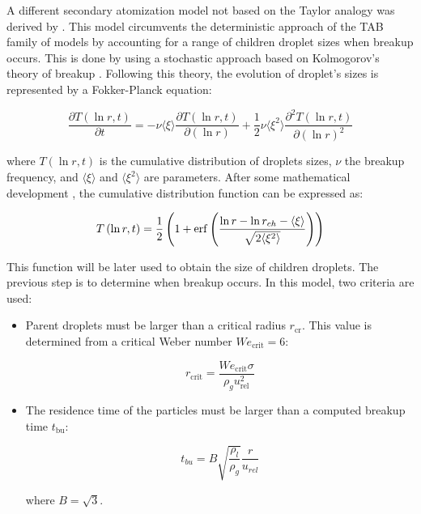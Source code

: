 A different secondary atomization model not based on the Taylor analogy was derived by . This model circumvents the deterministic approach of the TAB family of models by accounting for a range of children droplet sizes when breakup occurs. This is done by using a stochastic approach based on Kolmogorov's theory of breakup . Following this theory, the evolution of droplet's sizes is represented by a Fokker-Planck equation: 

\begin{equation}
\frac{\partial T \left( \ln r, t \right)}{\partial t} = - \nu  \langle \xi \rangle  \frac{\partial T \left( \ln r, t \right)}{\partial \left( \ln r \right)} + \frac{1}{2} \nu  \langle \xi^2 \rangle  \frac{\partial^2 T \left( \ln r, t \right)}{\partial \left( \ln r \right)^2}
\end{equation}

where $T \left( \ln r, t \right)$ is the cumulative distribution of droplets sizes, $\nu$ the breakup frequency, and  $\langle \xi \rangle$ and $ \langle \xi^2 \rangle$ are parameters. After some mathematical development , the cumulative distribution function can be expressed as:

\begin{equation}
\label{eq:gorokhovski_T_CDF}
T \left( \ln r, t \right) = \frac{1}{2} \left( 1 + \operatorname{erf} \left( \frac{\ln r - \ln r_{ch} - \langle \xi \rangle }{\sqrt{2 \langle \xi^2 \rangle}}\right)  \right)
\end{equation}

This function will be later used to obtain the size of children droplets. The previous step is to determine when breakup occurs. In this model, two criteria are used:

\begin{itemize}

	\item Parent droplets must be larger than a critical radius $r_\mathrm{cr}$. This value is determined from a critical Weber number $We_\mathrm{crit} = 6$:
	
	\begin{equation}
	r_\mathrm{crit} = \frac{We_\mathrm{crit} \sigma}{\rho_g u_\mathrm{rel}^2}
	\end{equation}
	
	\item The residence time of the particles must be larger than a computed breakup time $t_\mathrm{bu}$:
	
	\begin{equation}
	t_{bu} = B \sqrt{\frac{\rho_l}{\rho_g}} \frac{r}{u_{rel}}
	\end{equation}
	
	where $B = \sqrt{3}$.

\end{itemize}

